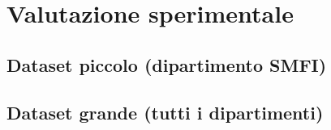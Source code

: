 \section{Valutazione sperimentale}
\label{sec:expval}

\subsection{Dataset piccolo (dipartimento SMFI)}
\label{sec:-dataset-dipartimento-smfi}

\subsection{Dataset grande (tutti i dipartimenti)}
\label{sec:dataset-tutti-dipartimenti}